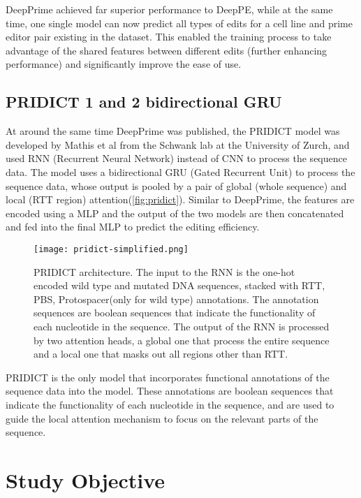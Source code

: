 DeepPrime achieved far superior performance to DeepPE, while at the same time, one single model can now predict all types of edits for a cell line and prime editor pair existing in the dataset. This enabled the training process to take advantage of the shared features between different edits (further enhancing performance) and significantly improve the ease of use.

\subsection{PRIDICT 1 and 2 bidirectional GRU}

At around the same time DeepPrime was published, the PRIDICT model was developed by Mathis et al from the Schwank lab at the University of Zurch, and used RNN (Recurrent Neural Network) instead of CNN to process the sequence data\cite{mathisPredictingPrimeEditing2023}. The model uses a bidirectional GRU (Gated Recurrent Unit) to process the sequence data, whose output is pooled by a pair of global (whole sequence) and local (RTT region) attention(\autoref{fig:pridict}). Similar to DeepPrime, the features are encoded using a MLP and the output of the two models are then concatenated and fed into the final MLP to predict the editing efficiency.

\begin{figure}
    \centering
    \texttt{[image: pridict-simplified.png]}
    \caption[PRIDICT architecture]{PRIDICT architecture. The input to the RNN is the one-hot encoded wild type and mutated DNA sequences, stacked with RTT, PBS, Protospacer(only for wild type) annotations. The annotation sequences are boolean sequences that indicate the functionality of each nucleotide in the sequence. The output of the RNN is processed by two attention heads, a global one that process the entire sequence and a local one that masks out all regions other than RTT. }
    \label{fig:pridict}
\end{figure}

PRIDICT is the only model that incorporates functional annotations of the sequence data into the model. These annotations are boolean sequences that indicate the functionality of each nucleotide in the sequence, and are used to guide the local attention mechanism to focus on the relevant parts of the sequence. 

\section{Study Objective}

